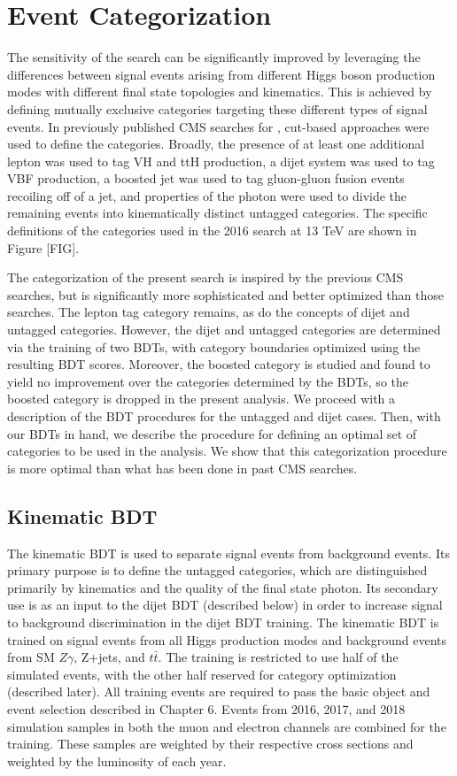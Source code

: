 \chapter{Event Categorization}

The sensitivity of the \hzg search can be significantly improved by leveraging the differences between signal events
arising from different Higgs boson production modes with different final state topologies and kinematics. 
This is achieved by defining mutually exclusive categories targeting these different types of signal events. In previously 
published CMS searches for \hzg [REFS], cut-based approaches were used to define the categories. Broadly, the presence of at least 
one additional lepton was used to tag VH and ttH production, a dijet system was used to tag VBF production, a boosted jet was 
used to tag gluon-gluon fusion events recoiling off of a jet, and properties of the photon were used to divide the remaining 
events into kinematically distinct untagged categories. The specific definitions of the categories used in the 2016 search 
at 13 TeV are shown in Figure [FIG]. 

The categorization of the present search is inspired by the previous CMS searches, but is significantly more sophisticated and 
better optimized than those searches. The lepton tag category remains, as do the concepts of dijet and untagged categories. 
However, the dijet and untagged categories are determined via the training of two BDTs, with category 
boundaries optimized using the resulting BDT scores. Moreover, the boosted category is studied and found to yield no 
improvement over the categories determined by the BDTs, so the boosted category is dropped in the present analysis. We proceed with 
a description of the BDT procedures for the untagged and dijet cases. Then, with our BDTs in hand, we describe the procedure 
for defining an optimal set of categories to be used in the analysis. We show that this categorization procedure is more 
optimal than what has been done in past CMS searches. 

\section{Kinematic BDT}

The kinematic BDT is used to separate \hzg signal events from background events. Its primary purpose is to define the 
untagged categories, which are distinguished primarily by kinematics and the quality of the final state photon. Its secondary 
use is as an input to the dijet BDT (described below) in order to increase signal to background discrimination in the 
dijet BDT training. The kinematic BDT is trained on \hzg signal events from all Higgs production modes and background events from 
SM $Z\gamma$, Z+jets, and $t\bar{t}$. The training is restricted to use half of the simulated events, with the other half 
reserved for category optimization (described later). All training events are required to pass the basic object and 
event selection described in Chapter 6. Events from 2016, 2017, and 2018 simulation samples in both the muon and electron channels 
are combined for the training. These samples are weighted by their respective cross sections and weighted by the luminosity of
each year. 

